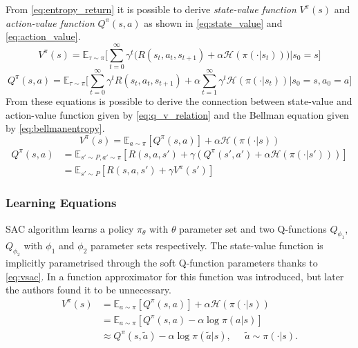 From \vref{eq:entropy_return} it is possible to derive \textit{state-value function} $V^\pi(s)$ and \textit{action-value function} $Q^\pi(s,a)$ as shown in \vref{eq:state_value} and \vref{eq:action_value}.
\begin{equation} \label{eq:state_value}
V^\pi(s) = \mathbb{E}_{\tau \sim \pi}\Bigg[\sum_{t=0}^{\infty} \gamma^t \bigg(R(s_t, a_t, s_{t+1}) + \alpha \mathcal{H}(\pi(\cdot|s_t))\bigg)\bigg|s_0 = s\Bigg]
\end{equation}	
\begin{equation} \label{eq:action_value}
Q^\pi(s,a) = \mathbb{E}_{\tau \sim \pi}\Bigg[\sum_{t=0}^{\infty} \gamma^t R(s_t, a_t, s_{t+1}) + \alpha \sum_{t=1}^{\infty} \gamma^t \mathcal{H}(\pi(\cdot|s_t))\bigg|s_0 = s, a_0 =a\Bigg]
\end{equation}	
From these equations is possible to derive the connection between state-value and action-value function given by \vref{eq:q_v_relation} and the Bellman equation given by \vref{eq:bellmanentropy}.
\begin{equation} \label{eq:q_v_relation}
V^\pi(s) = \mathbb{E}_{a\sim\pi}[Q^\pi(s,a)] + \alpha \mathcal{H}(\pi(\cdot|s))
\end{equation}
\begin{equation}
\begin{aligned} 	\label{eq:bellmanentropy}
Q^\pi(s,a) &= \mathbb{E}_{s'\sim P, a'\sim\pi}[R(s,a,s') + \gamma(Q^\pi(s',a') + \alpha \mathcal{H}(\pi(\cdot|s')))]\\
&= \mathbb{E}_{s'\sim P}[R(s,a,s') + \gamma V^\pi(s')]
\end{aligned}
\end{equation}

\subsubsection{Learning Equations}
SAC algorithm learns a policy $\pi_\theta$ with $\theta$ parameter set and two Q-functions $Q_{\phi_1}$,  $Q_{\phi_2}$ with $\phi_1$ and $\phi_2$ parameter sets respectively.
The state-value function is implicitly parametrised through the soft Q-function parameters thanks to \vref{eq:vsac}.
In \cite{haarnoja2018soft} a function approximator for this function was introduced, but later \cite{haarnoja2018alg} the authors found it to be unnecessary.
\begin{equation} \label{eq:vsac}
	\begin{aligned} 
	V^{\pi}(s) &= \mathbb{E}_{a \sim \pi}[Q^{\pi}(s,a)] + \alpha \mathcal{H} \left(\pi(\cdot|s)\right) \\
	&= \mathbb{E}_{a \sim \pi}[Q^{\pi}(s,a) - \alpha \log \pi(a|s)] \\
	& \approx Q^{\pi}(s,\tilde{a}) - \alpha \log \pi(\tilde{a}|s), \;\;\;\;\; \tilde{a} \sim \pi(\cdot|s).	
	\end{aligned}
\end{equation}

